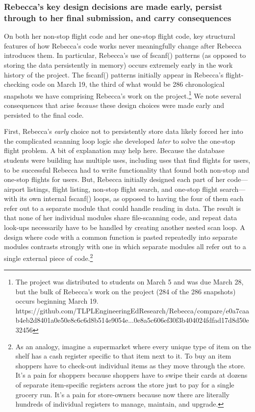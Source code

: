 \subsubsection{Rebecca's key design decisions are made early, persist
through to her final submission, and carry
consequences}\label{rebeccas-key-design-decisions-are-made-early-persist-through-to-her-final-submission-and-carry-consequences}

On both her non-stop flight code and her one-stop flight code, key
structural features of how Rebecca's code works never meaningfully
change after Rebecca introduces them. In particular, Rebecca's use of
fscanf() patterns (as opposed to storing the data persistently in
memory) occurs extremely early in the work history of the project. The
fscanf() patterns initially appear in Rebecca's flight-checking code on
March 19, the third of what would be 286 chronological snapshots we have
comprising Rebecca's work on the project.\footnote{The project was
  distributed to students on March 5 and was due March 28, but the bulk
  of Rebecca's work on the project (284 of the 286 snapshots) occurs
  beginning March 19.
  https://github.com/TLPLEngineeringEdResearch/Rebecca/compare/e0a7caab4eb2d8401a0e50e8c6c6d8b514e9054e...0e8a5c606ef30f3b404024fdfad17d8d50e32456}
We note several consequences that arise \emph{because} these design
choices were made early and persisted to the final code.

First, Rebecca's \emph{early} choice not to persistently store data
likely forced her into the complicated scanning loop logic she developed
\emph{later} to solve the one-stop flight problem. A bit of explanation
may help here. Because the database students were building has multiple
uses, including uses that find flights for users, to be successful
Rebecca had to write functionality that found both non-stop and one-stop
flights for users. But, Rebecca initially designed each part of her
code---airport listings, flight listing, non-stop flight search, and
one-stop flight search---with its own internal fscanf() loops, as
opposed to having the four of them each refer out to a separate module
that could handle reading in data. The result is that none of her
individual modules share file-scanning code, and repeat data look-ups
necessarily have to be handled by creating another nested scan loop. A
design where code with a common function is pasted repeatedly into
separate modules contrasts strongly with one in which separate modules
all refer out to a single external piece of code.\footnote{As an
  analogy, imagine a supermarket where every unique type of item on the
  shelf has a cash register specific to that item next to it. To buy an
  item shoppers have to check-out individual items as they move through
  the store. It's a pain for shoppers because shoppers have to swipe
  their cards at dozens of separate item-specific registers across the
  store just to pay for a single grocery run. It's a pain for
  store-owners because now there are literally hundreds of individual
  registers to manage, maintain, and upgrade.}

